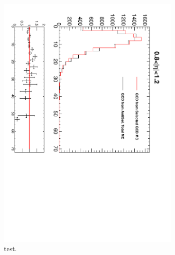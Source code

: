 \begin{figure}[htbp]
\begin{subfigure}{0.45\textwidth}
    \includegraphics*[trim = 0mm 0mm 15mm 0mm, clip, width=\textwidth, angle=90]{MetCompare_anti_eta3.pdf}
    \caption{test.}
    \label{fig:qcd_met_eta3}
  \end{subfigure}
  \begin{subfigure}{0.45\textwidth}
    \centering

\end{subfigure}
\end{figure}
